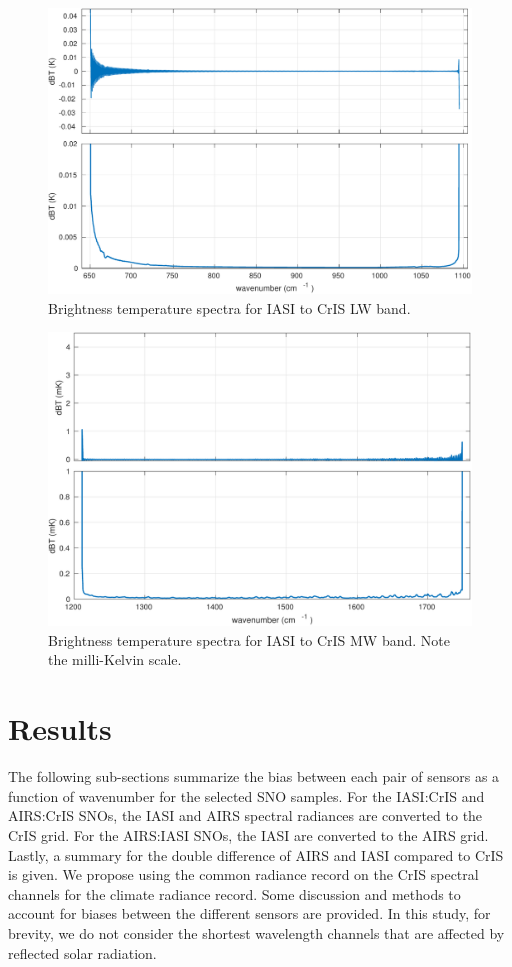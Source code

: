 \documentclass[11pt]{article}
\begin{document}
\begin{figure}[htb]
\centering
\includegraphics[width=.6\linewidth]{./figs/iasi2cris_vs_truth_LW.pdf}
\caption{\label{fig:orgparagraph1}
  Brightness temperature spectra for IASI to CrIS LW band.}
\label{fig:2a}
\end{figure}

\begin{figure}[htb]
\centering
\includegraphics[width=.6\linewidth]{./figs/iasi2cris_vs_truth_MW.pdf}
\caption{\label{fig:orgparagraph1}
  Brightness temperature spectra for IASI to CrIS MW band. Note the milli-Kelvin scale.}
\label{fig:2b}
\end{figure}


\section{Results}
\label{sec:orgheadline12}
The following sub-sections summarize the bias between each pair of sensors as a function of wavenumber for the selected SNO samples. For the IASI:CrIS and AIRS:CrIS SNOs, the IASI and AIRS spectral radiances are converted to the CrIS grid.  For the AIRS:IASI SNOs, the IASI are converted to the AIRS grid. Lastly, a summary for the double difference of AIRS and IASI compared to CrIS is given. We propose using the common radiance record on the CrIS spectral channels for the climate radiance record. Some discussion and methods to account for biases between the different sensors are provided. In this study, for brevity, we do not consider the shortest wavelength channels that are affected by reflected solar radiation.
\end{document}
